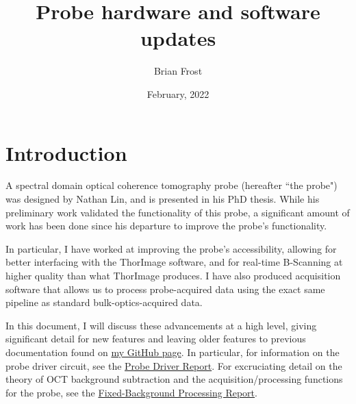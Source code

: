 \documentclass{article}
\title{Probe hardware and software updates}
\date{February, 2022}
\author{Brian Frost}
\begin{document}
\maketitle

\section{Introduction}

\par{A spectral domain optical coherence tomography probe (hereafter ``the probe") was designed by Nathan Lin, and is presented in his PhD thesis. While his preliminary work validated the functionality of this probe, a significant amount of work has been done since his departure to improve the probe's functionality.}
\par{In particular, I have worked at improving the probe's accessibility, allowing for better interfacing with the ThorImage software, and for real-time B-Scanning at higher quality than what ThorImage produces. I have also produced acquisition software that allows us to process probe-acquired data using the exact same pipeline as standard bulk-optics-acquired data.}
\par{In this document, I will discuss these advancements at a high level, giving significant detail for new features and leaving older features to previous documentation found on \href{https://github.com/Brian-Frost-LaPlante/LabReports}{my GitHub page}. In particular, for information on the probe driver circuit, see the \href{https://github.com/Brian-Frost-LaPlante/LabReports/blob/main/ProbeReports/ProbeDriverReport.pdf}{Probe Driver Report}. For excruciating detail on the theory of OCT background subtraction and the acquisition/processing functions for the probe, see the \href{https://github.com/Brian-Frost-LaPlante/LabReports/blob/main/ProbeReports/Fixed-BackgroundProcessing.pdf}{Fixed-Background Processing Report}.}
\end{document}
